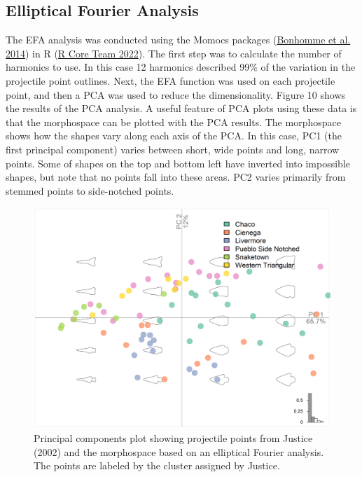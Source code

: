 \documentclass{article}
\begin{document}
\hypertarget{elliptical-fourier-analysis}{%
\subsection{Elliptical Fourier
Analysis}\label{elliptical-fourier-analysis}}

The EFA analysis was conducted using the Momocs packages
(\protect\hyperlink{ref-Bonhomme2014-gt}{Bonhomme et al. 2014}) in R
(\protect\hyperlink{ref-R_Core_Team2022-wb}{R Core Team 2022}). The
first step was to calculate the number of harmonics to use. In this case
12 harmonics described 99\% of the variation in the projectile point
outlines. Next, the EFA function was used on each projectile point, and
then a PCA was used to reduce the dimensionality. Figure 10 shows the
results of the PCA analysis. A useful feature of PCA plots using these
data is that the morphospace can be plotted with the PCA results. The
morphospace shows how the shapes vary along each axis of the PCA. In
this case, PC1 (the first principal component) varies between short,
wide points and long, narrow points. Some of shapes on the top and
bottom left have inverted into impossible shapes, but note that no
points fall into these areas. PC2 varies primarily from stemmed points
to side-notched points.

\begin{figure}
\includegraphics[width=1\linewidth]{figures/JusticeEFAPCA} \caption{Principal components plot showing projectile points from Justice (2002) and the morphospace based on an elliptical Fourier analysis. The points are labeled by the cluster assigned by Justice.}\label{fig:JusticeEFAPCA}
\end{figure}
\end{document}
